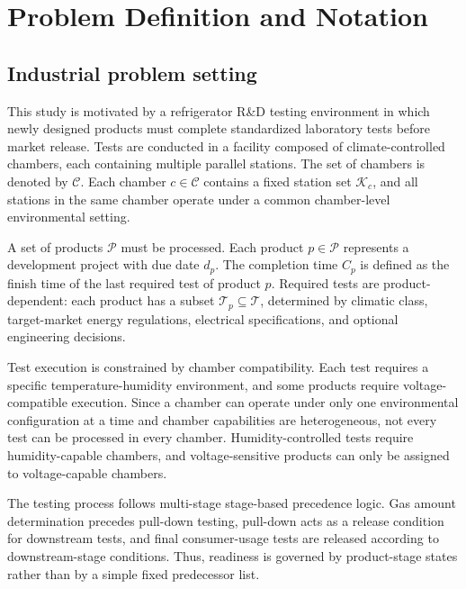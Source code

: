 \section{Problem Definition and Notation}
\label{sec:pd}

\subsection{Industrial problem setting}
\label{subsec:industrial_setting}

This study is motivated by a refrigerator R\&D testing environment in which newly designed products must complete standardized laboratory tests before market release. Tests are conducted in a facility composed of climate-controlled chambers, each containing multiple parallel stations. The set of chambers is denoted by \(\mathcal{C}\). Each chamber \(c\in\mathcal{C}\) contains a fixed station set \(\mathcal{K}_c\), and all stations in the same chamber operate under a common chamber-level environmental setting.

A set of products \(\mathcal{P}\) must be processed. Each product \(p\in\mathcal{P}\) represents a development project with due date \(d_p\). The completion time \(C_p\) is defined as the finish time of the last required test of product \(p\). Required tests are product-dependent: each product has a subset \(\mathcal{T}_p\subseteq\mathcal{T}\), determined by climatic class, target-market energy regulations, electrical specifications, and optional engineering decisions.

Test execution is constrained by chamber compatibility. Each test requires a specific temperature-humidity environment, and some products require voltage-compatible execution. Since a chamber can operate under only one environmental configuration at a time and chamber capabilities are heterogeneous, not every test can be processed in every chamber. Humidity-controlled tests require humidity-capable chambers, and voltage-sensitive products can only be assigned to voltage-capable chambers.

The testing process follows multi-stage stage-based precedence logic. Gas amount determination precedes pull-down testing, pull-down acts as a release condition for downstream tests, and final consumer-usage tests are released according to downstream-stage conditions. Thus, readiness is governed by product-stage states rather than by a simple fixed predecessor list.

